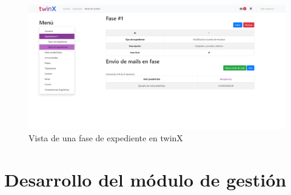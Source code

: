 \begin{figure}
	\centering
	\includegraphics[width=\textwidth]{"Capturas de twinX/fases_expedientes_vista"}
	\caption{Vista de una fase de expediente en twinX}
	\label{fig:fasesexpedientesvista}
\end{figure}

\section{Desarrollo del módulo de gestión}




